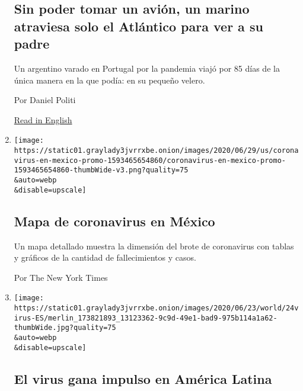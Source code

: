 \begin{enumerate}
  \hypertarget{sin-poder-tomar-un-aviuxf3n-un-marino-atraviesa-solo-el-atluxe1ntico-para-ver-a-su-padre}{%
  \subsection{Sin poder tomar un avión, un marino atraviesa solo el
  Atlántico para ver a su
  padre}\label{sin-poder-tomar-un-aviuxf3n-un-marino-atraviesa-solo-el-atluxe1ntico-para-ver-a-su-padre}}

  Un argentino varado en Portugal por la pandemia viajó por 85 días de
  la única manera en la que podía: en su pequeño velero.

  Por Daniel Politi

  \href{https://www.nytimes3xbfgragh.onion/2020/06/28/world/americas/coronavirus-argentina-sailor.html}{Read
  in English}
\item
  \href{/es/interactive/2020/espanol/america-latina/coronavirus-en-mexico.html}{}

  \texttt{[image: https://static01.graylady3jvrrxbe.onion/images/2020/06/29/us/coronavirus-en-mexico-promo-1593465654860/coronavirus-en-mexico-promo-1593465654860-thumbWide-v3.png?quality=75\\\&auto=webp\\\&disable=upscale]}

  \hypertarget{mapa-de-coronavirus-en-muxe9xico}{%
  \subsection{Mapa de coronavirus en
  México}\label{mapa-de-coronavirus-en-muxe9xico}}

  Un mapa detallado muestra la dimensión del brote de coronavirus con
  tablas y gráficos de la cantidad de fallecimientos y casos.

  Por The New York Times
\item
  \href{/es/2020/06/24/espanol/america-latina/coronavirus-mexico-brasil-peru-chile-uruguay.html}{}

  \texttt{[image: https://static01.graylady3jvrrxbe.onion/images/2020/06/23/world/24virus-ES/merlin\_173821893\_13123362-9c9d-49e1-bad9-975b114a1a62-thumbWide.jpg?quality=75\\\&auto=webp\\\&disable=upscale]}

  \hypertarget{el-virus-gana-impulso-en-amuxe9rica-latina}{%
  \subsection{El virus gana impulso en América
  Latina}\label{el-virus-gana-impulso-en-amuxe9rica-latina}}


\end{enumerate}
